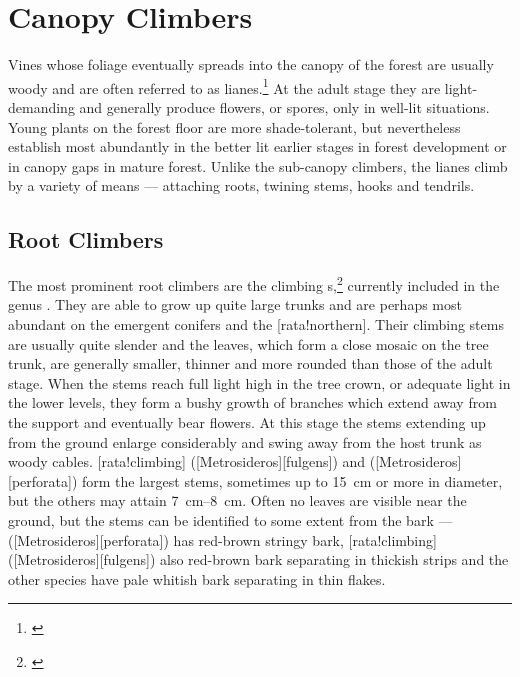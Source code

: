 \section{Canopy Climbers}

Vines whose foliage eventually spreads into the canopy of the forest are usually woody and are often referred to as lianes.\footnote{\cite{bird1916observations}}
At the adult stage they are light-demanding and generally produce flowers, or spores, only in well-lit situations.
Young plants on the forest floor are more shade-tolerant, but nevertheless establish most abundantly in the better lit earlier stages in forest development or in canopy gaps in mature forest.
Unlike the sub-canopy climbers, the lianes climb by a variety of means --- attaching roots, twining stems, hooks and tendrils.

\subsection{Root Climbers}

The most prominent root climbers are the climbing s,\footnote{\cite{dawson1967growth}} currently included in the genus .
They are able to grow up quite large trunks and are perhaps most abundant on the emergent conifers and the [rata!northern].
Their climbing stems are usually quite slender and the leaves, which form a close mosaic on the tree trunk, are generally smaller, thinner and more rounded than those of the adult stage.
When the stems reach full light high in the tree crown, or adequate light in the lower levels, they form a bushy growth of branches which extend away from the support and eventually bear flowers.
At this stage the stems extending up from the ground enlarge considerably and swing away from the host trunk as woody cables. [rata!climbing] ([Metrosideros][fulgens]) and  ([Metrosideros][perforata]) form the largest stems, sometimes up to \SI{15}{\centi\metre} or more in diameter, but the others may attain \SIrange{7}{8}{\centi\metre}.
Often no leaves are visible near the ground, but the stems can be identified to some extent from the bark ---  ([Metrosideros][perforata]) has red-brown stringy bark, [rata!climbing] ([Metrosideros][fulgens]) also red-brown bark separating in thickish strips and the other species have pale whitish bark separating in thin flakes.

